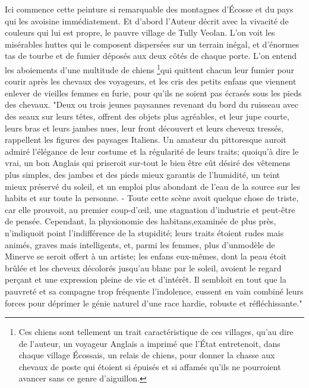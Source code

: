 Ici commence cette peinture si remarquable des montagnes d'Écosse et du pays qui les avoisine immédiatement. Et d'abord l'Auteur décrit avec la vivacité de couleurs qui lui est propre, le pauvre village de Tully Veolan. L'on voit les misérables huttes qui le composent dispersées sur un terrain inégal, et d'énormes tas de tourbe et de fumier déposés aux deux côtés de chaque porte. L'on entend les aboiements d'une multitude de chiens \footnote{Ces chiens sont tellement un trait caractéristique de ces villages, qu'au dire de l'auteur, un voyageur Anglais a imprimé que l'État entretenoit, dans chaque village Écossais, un relais de chiens, pour donner la chasse aux chevaux de poste qui étoient si épuisés et si affamés qu'ils ne pourroient avancer sans ce genre d'aiguillon.}qui quittent chacun leur fumier pour courir après les chevaux des voyageurs,\setcounter{page}{544} et les cris des petits enfans que viennent enlever de vieilles femmes en furie, pour qu'ils ne soient pas écrasés sous les pieds des chevaux. "Deux ou trois jeunes paysannes revenant du bord du ruisseau avec des seaux sur leurs têtes, offrent des objets plus agréables, et leur jupe courte, leurs bras et leurs jambes nues, leur front découvert et leurs cheveux tressés, rappellent les figures des paysages Italiens. Un amateur du pittoresque auroit admiré l'élégance de leur costume et la régularité de leurs traits; quoiqu'à dire le vrai, un bon Anglais qui priseroit sur-tout le bien être eût désiré des vêtemens plus simples, des jambes et des pieds mieux garantis de l'humidité, un teint mieux préservé du soleil, et un emploi plus abondant de l'eau de la source sur les habits et sur toute la personne. - Toute cette scène avoit quelque chose de triste, car elle prouvoit, au premier coup-d'œil, une stagnation d'industrie et peut-être de pensée. Cependant, la physionomie des habitans,examinée de plus près, n'indiquoit point l'indifférence de la stupidité; leurs traits étoient rudes mais animés, graves mais intelligents, et, parmi les femmes, plus d'unmodèle de Minerve se seroit offert à un artiste; les enfans eux-mêmes, dont la peau\setcounter{page}{545} étoit brûlée et les cheveux décolorés jusqu'au blanc par le soleil, avoient le regard perçant et une expression pleine de vie et d'intérêt. Il sembloit en tout que la pauvreté et sa compagne trop fréquente l'indolence, eussent en vain combiné leurs forces pour déprimer le génie naturel d'une race hardie, robuste et réfléchissante."
